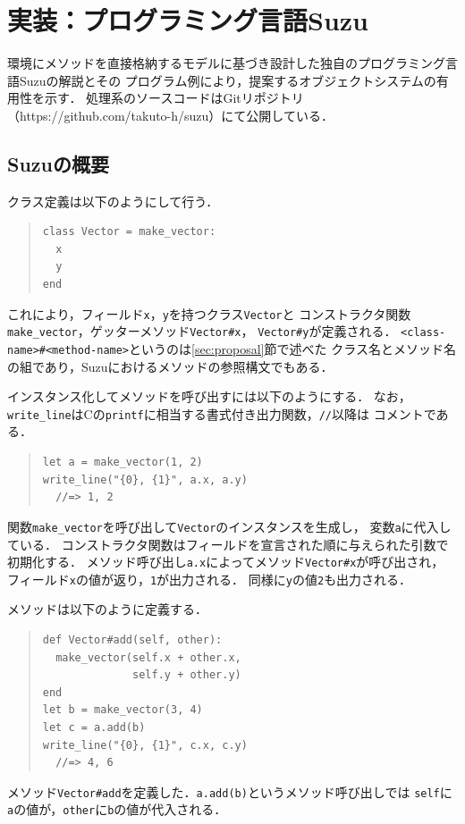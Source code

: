 \documentclass{ipsjprosym}
\begin{document}
\section{実装：プログラミング言語Suzu}
\label{sec:implementation}

環境にメソッドを直接格納するモデルに基づき設計した独自のプログラミング言語Suzuの解説とその
プログラム例により，提案するオブジェクトシステムの有用性を示す．
処理系のソースコードはGitリポジトリ（https://github.com/takuto-h/suzu）にて公開している．

\subsection{Suzuの概要}

クラス定義は以下のようにして行う．
\begin{quote}
\begin{verbatim}
class Vector = make_vector:
  x
  y
end
\end{verbatim}
\end{quote}
これにより，フィールド\verb|x|，\verb|y|を持つクラス\verb|Vector|と
コンストラクタ関数\verb|make_vector|，ゲッターメソッド\verb|Vector#x|，
\verb|Vector#y|が定義される．
\verb|<class-name>#<method-name>|というのは\ref{sec:proposal}節で述べた
クラス名とメソッド名の組であり，Suzuにおけるメソッドの参照構文でもある．

インスタンス化してメソッドを呼び出すには以下のようにする．
なお，\verb|write_line|はCの\verb|printf|に相当する書式付き出力関数，\verb|//|以降は
コメントである．
\begin{quote}
\begin{verbatim}
let a = make_vector(1, 2)
write_line("{0}, {1}", a.x, a.y)
  //=> 1, 2
\end{verbatim}
\end{quote}
関数\verb|make_vector|を呼び出して\verb|Vector|のインスタンスを生成し，
変数\verb|a|に代入している．
コンストラクタ関数はフィールドを宣言された順に与えられた引数で初期化する．
メソッド呼び出し\verb|a.x|によってメソッド\verb|Vector#x|が呼び出され，
フィールド\verb|x|の値が返り，\verb|1|が出力される．
同様に\verb|y|の値\verb|2|も出力される．

メソッドは以下のように定義する．
\begin{quote}
\begin{verbatim}
def Vector#add(self, other):
  make_vector(self.x + other.x,
              self.y + other.y)
end
let b = make_vector(3, 4)
let c = a.add(b)
write_line("{0}, {1}", c.x, c.y)
  //=> 4, 6 
\end{verbatim}
\end{quote}
メソッド\verb|Vector#add|を定義した．\verb|a.add(b)|というメソッド呼び出しでは
\verb|self|に\verb|a|の値が，\verb|other|に\verb|b|の値が代入される．
\end{document}
